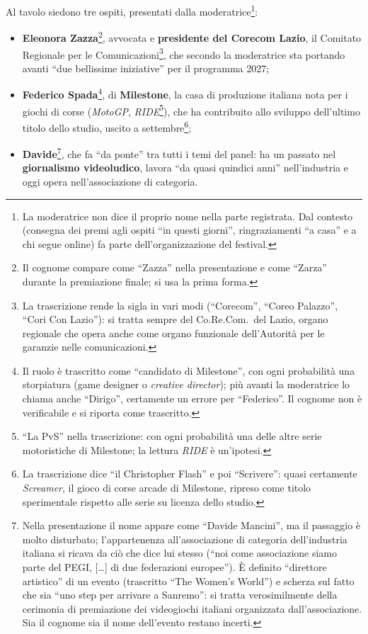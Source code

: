 Al tavolo siedono tre ospiti, presentati dalla moderatrice\footnote{La
moderatrice non dice il proprio nome nella parte registrata. Dal contesto
(consegna dei premi agli ospiti ``in questi giorni'', ringraziamenti ``a
casa'' e a chi segue online) fa parte dell'organizzazione del festival.}:
\begin{itemize}
  \item \textbf{Eleonora Zazza}\footnote{Il cognome compare come ``Zazza'' nella
        presentazione e come ``Zarza'' durante la premiazione finale; si usa la
        prima forma.}, avvocata e \textbf{presidente del Corecom Lazio}, il
        Comitato Regionale per le Comunicazioni\footnote{La trascrizione rende la
        sigla in vari modi (``Corecom'', ``Coreo Palazzo'', ``Cori Con Lazio''):
        si tratta sempre del Co.Re.Com.\ del Lazio, organo regionale che opera
        anche come organo funzionale dell'Autorità per le garanzie nelle
        comunicazioni.}, che secondo la moderatrice sta portando avanti ``due
        bellissime iniziative'' per il programma 2027;
  \item \textbf{Federico Spada}\footnote{Il ruolo è trascritto come ``candidato
        di Milestone'', con ogni probabilità una storpiatura (game designer o
        \emph{creative director}); più avanti la moderatrice lo chiama anche
        ``Dirigo'', certamente un errore per ``Federico''. Il cognome non è
        verificabile e si riporta come trascritto.}, di \textbf{Milestone}, la
        casa di produzione italiana nota per i giochi di corse (\emph{MotoGP},
        \emph{RIDE}\footnote{``La PvS'' nella trascrizione: con ogni
        probabilità una delle altre serie motoristiche di Milestone; la lettura
        \emph{RIDE} è un'ipotesi.}), che ha contribuito allo sviluppo
        dell'ultimo titolo dello studio, uscito a settembre\footnote{La
        trascrizione dice ``il Christopher Flash'' e poi ``Scrivere'': quasi
        certamente \emph{Screamer}, il gioco di corse arcade di Milestone,
        ripreso come titolo sperimentale rispetto alle serie su licenza dello
        studio.};
  \item \textbf{Davide}\footnote{Nella presentazione il nome appare come
        ``Davide Mancini'', ma il passaggio è molto disturbato; l'appartenenza
        all'associazione di categoria dell'industria italiana si ricava da ciò
        che dice lui stesso (``noi come associazione siamo parte del PEGI, [\dots]
        di due federazioni europee''). È definito ``direttore artistico'' di un
        evento (trascritto ``The Women's World'') e scherza sul fatto che sia
        ``uno step per arrivare a Sanremo'': si tratta verosimilmente della
        cerimonia di premiazione dei videogiochi italiani organizzata
        dall'associazione. Sia il cognome sia il nome dell'evento restano
        incerti.}, che fa ``da ponte'' tra tutti i temi del panel: ha un passato
        nel \textbf{giornalismo videoludico}, lavora ``da quasi quindici anni''
        nell'industria e oggi opera nell'associazione di categoria.
\end{itemize}

